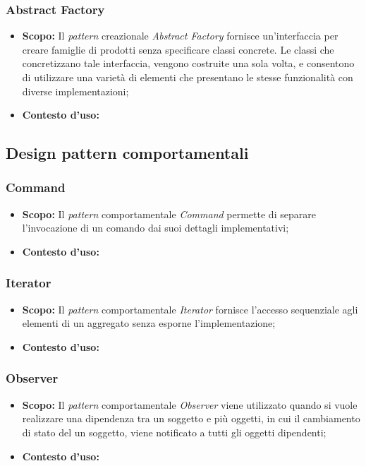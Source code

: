 \subsubsection{Abstract Factory}
\begin{itemize}
\item \textbf{Scopo:}
Il \textit{pattern} creazionale \textit{Abstract Factory} fornisce un'interfaccia per creare famiglie di prodotti senza specificare classi concrete. Le classi che concretizzano tale interfaccia, vengono costruite una sola volta, e consentono di utilizzare una varietà di elementi che presentano le stesse funzionalità con diverse implementazioni;

\item \textbf{Contesto d'uso:}
\end{itemize}

\subsection{Design pattern comportamentali}
\subsubsection{Command}
\begin{itemize}
\item \textbf{Scopo:}
Il \textit{pattern} comportamentale \textit{Command} permette di separare l'invocazione di un comando dai suoi dettagli implementativi;

\item \textbf{Contesto d'uso:}
\end{itemize}

\subsubsection{Iterator}
\begin{itemize}
\item \textbf{Scopo:}
Il \textit{pattern} comportamentale \textit{Iterator} fornisce l'accesso sequenziale agli elementi di un aggregato senza esporne l'implementazione;

\item \textbf{Contesto d'uso:}
\end{itemize}

\subsubsection{Observer}
\begin{itemize}
\item \textbf{Scopo:}
Il \textit{pattern} comportamentale \textit{Observer} viene utilizzato quando si vuole realizzare una dipendenza tra un soggetto e più oggetti, in cui il cambiamento di stato del un soggetto, viene notificato a tutti gli oggetti dipendenti;

\item \textbf{Contesto d'uso:}
\end{itemize}

